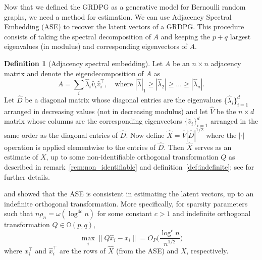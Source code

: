 \documentclass[
  12pt,
]{article}
\theoremstyle{definition}
\newtheorem{definition}{Definition}[section]
\theoremstyle{definition}
\theoremstyle{definition}
\theoremstyle{definition}
\theoremstyle{remark}
\begin{document}
Now that we defined the GRDPG as a generative model for Bernoulli random graphs,
we need a method for estimation.
We can use Adjacency Spectral Embedding (ASE) \citep{doi:10.1080/01621459.2012.699795} to recover the latent vectors of a GRDPG.
This procedure consists of taking the spectral decomposition of \(A\) and keeping the \(p + q\) largest eigenvalues (in modulus) and corresponding eigenvectors of \(A\).

\begin{definition}[Adjacency spectral embedding]
\label{def:ase}
Let $A$ be an $n
\times n$ adjacency matrix and denote the
eigendecomposition of $A$ as
$$A = \sum_{i} \hat{\lambda}_i \hat{v}_i \hat{v}_i^{\top}, \quad
\text{where} \,\,
|\hat{\lambda}|_1 \geq |\hat{\lambda}_2| \geq \dots \geq
|\hat{\lambda}_n|.$$
Let $\hat{D}$ be a diagonal matrix whose diagonal entries are
the eigenvalues $\{\hat{\lambda}_i\}_{i=1}^{d}$ arranged in decreasing values (not in
decreasing modulus) and let $\hat{V}$ be the $n \times d$ matrix whose
columns are the corresponding eigenvectors $\{\hat{v}_i\}_{i=1}^{d}$
arranged in the same order as the diagonal entries of $\hat{D}$. Now
define $\hat{X} = \hat{V} |\hat{D}|^{1/2}$ where the $|\cdot|$
operation is applied elementwise to the entries of $\hat{D}$. Then
$\hat{X}$ serves as an estimate of $X$, up to some non-identifiable
orthogonal transformation $Q$ as described in
remark~\ref{rem:non_identifiable} and definition~\ref{def:indefinite};
see \citet{rubindelanchy2017statistical} for further details.
\end{definition}

\citet{doi:10.1080/01621459.2012.699795} and \citet{rubindelanchy2017statistical} showed that the ASE is consistent in estimating the latent vectors, up to an indefinite orthogonal transformation.
More specifically, for sparsity parameters such that \(n \rho_n = \omega (\log^{4 c} n)\) for some constant \(c > 1\) and indefinite orthogonal transformation \(Q \in \mathbb{O}(p, q)\),
\[\max_i \|Q \hat{x}_i - x_i \| = O_P \bigg( \frac{\log^c n}{n^{1/2}} \bigg)\]
where \(x_i^\top\) and \(\hat{x}_i^\top\) are the rows of \(\hat{X}\) (from the ASE) and \(X\), respectively.
\end{document}
